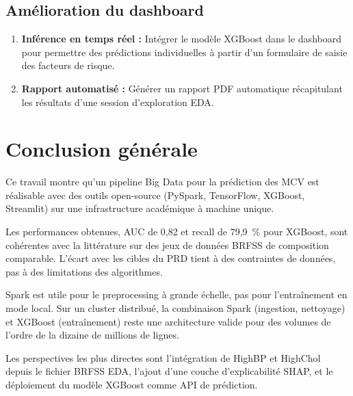\subsection{Amélioration du dashboard}

\begin{enumerate}
    \item \textbf{Inférence en temps réel :} Intégrer le modèle XGBoost dans le dashboard pour permettre des prédictions individuelles à partir d'un formulaire de saisie des facteurs de risque.
    \item \textbf{Rapport automatisé :} Générer un rapport PDF automatique récapitulant les résultats d'une session d'exploration EDA.
\end{enumerate}

\section{Conclusion générale}

Ce travail montre qu'un pipeline Big Data pour la prédiction des MCV est réalisable
avec des outils open-source (PySpark, TensorFlow, XGBoost, Streamlit)
sur une infrastructure académique à machine unique.

Les performances obtenues, AUC de 0,82 et recall de 79,9~\% pour XGBoost,
sont cohérentes avec la littérature sur des jeux de données BRFSS de composition
comparable. L'écart avec les cibles du PRD tient à des contraintes de données,
pas à des limitations des algorithmes.

Spark est utile pour le preprocessing à grande échelle, pas pour l'entraînement
en mode local. Sur un cluster distribué, la combinaison Spark (ingestion, nettoyage)
et XGBoost (entraînement) reste une architecture valide pour des volumes de l'ordre
de la dizaine de millions de lignes.

Les perspectives les plus directes sont l'intégration de HighBP et HighChol
depuis le fichier BRFSS EDA, l'ajout d'une couche d'explicabilité SHAP,
et le déploiement du modèle XGBoost comme API de prédiction.

